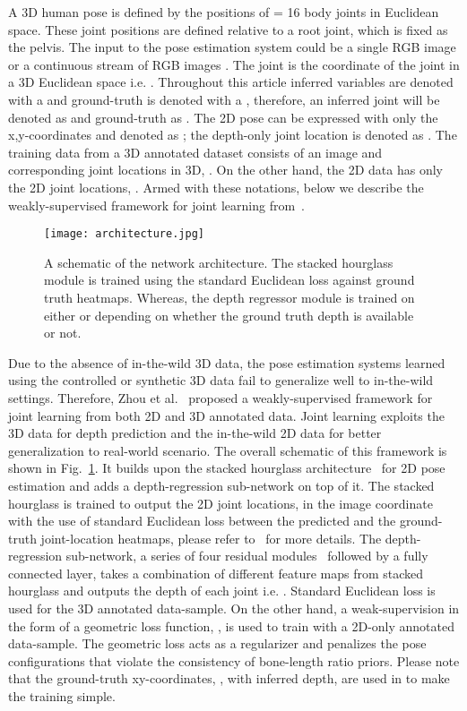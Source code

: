 \documentclass[runningheads]{llncs}
\begin{document}
A 3D human pose  is defined by the positions of  = 16 body joints in Euclidean space. These joint positions are defined relative to a root joint, which is fixed as the pelvis. The input to the pose estimation system could be a single RGB image or a continuous stream of RGB images . The  joint  is the coordinate of the joint in a 3D Euclidean space i.e. . Throughout this article inferred variables are denoted with a  and ground-truth is denoted with a , therefore, an inferred joint will be denoted as  and ground-truth as . The 2D pose can be expressed with only the x,y-coordinates and denoted as ; the depth-only joint location is denoted as . The  training data from a 3D annotated dataset consists of an image  and corresponding joint locations in 3D, . On the other hand, the 2D data has only the 2D joint locations, . Armed with these notations, below we describe the weakly-supervised framework for joint learning from~\cite{Zhou_2017_ICCV}.

\begin{figure}[!h] 
	\centering
	\texttt{[image: architecture.jpg]}
    \caption{ A schematic of the network architecture. The stacked hourglass module is trained using the standard Euclidean loss  against ground truth heatmaps. Whereas, the depth regressor module is trained on either  or  depending on whether the ground truth depth  is available or not.} 
	\vspace{-1em}
	\label{fig:architecture}
\end{figure}

Due to the absence of in-the-wild 3D data, the pose estimation systems learned using the controlled or synthetic 3D data fail to generalize well to in-the-wild settings. Therefore, Zhou et al.~\cite{Zhou_2017_ICCV} proposed a weakly-supervised framework for joint learning from both 2D and 3D annotated data. Joint learning exploits the 3D data for depth prediction and the in-the-wild 2D data for better generalization to real-world scenario. The overall schematic of this framework is shown in Fig.~\ref{fig:architecture}. It builds upon the stacked hourglass architecture~\cite{NewellYD16} for 2D pose estimation and adds a depth-regression sub-network on top of it. The stacked hourglass is trained to output the 2D joint locations,  in the image coordinate with the use of standard Euclidean loss between the predicted and the ground-truth joint-location heatmaps, please refer to~\cite{NewellYD16} for more details. The depth-regression sub-network, a series of four residual modules~\cite{he2016deep} followed by a fully connected layer, takes a combination of different feature maps from stacked hourglass and outputs the depth of each joint i.e. . Standard Euclidean loss  is used for the 3D annotated data-sample. On the other hand, a weak-supervision in the form of a geometric loss function, , is used to train with a 2D-only annotated data-sample. The geometric loss acts as a regularizer and penalizes the pose configurations that violate the consistency of bone-length ratio priors. Please note that the ground-truth xy-coordinates, , with inferred depth,  are used in  to make the training simple.
\end{document}

